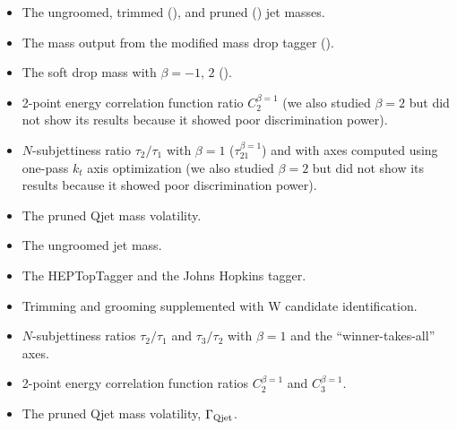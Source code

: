 \begin{itemize}
\item The ungroomed, trimmed (\mtrim), and pruned (\mprun) jet masses.
\item The mass output from the modified mass drop tagger (\mmdt).
\item The soft drop mass with $\beta=-1,\,2$ (\msd).
\item 2-point energy correlation function ratio $C_2^{\beta=1}$  (we also studied $\beta=2$ but did not show its results because it showed poor discrimination power).
\item $N$-subjettiness ratio $\tau_2 / \tau_1$ with $\beta=1$ ($\tau_{21}^{\beta=1}$) and with axes computed using one-pass $k_t$ axis optimization (we also studied $\beta=2$ but did not show its results because it showed poor discrimination power).
\item The pruned Qjet mass volatility.
\end{itemize}

\begin{itemize}
\item The ungroomed jet mass.
\item The HEPTopTagger and the Johns Hopkins tagger.
\item Trimming and grooming supplemented with W candidate identification.
\item $N$-subjettiness ratios $\tau_2 / \tau_1$ and $\tau_3/\tau_2$ with $\beta=1$ and the ``winner-takes-all'' axes.
\item 2-point energy correlation function ratios $C_2^{\beta=1}$ and $C_3^{\beta=1}$.
\item The pruned Qjet mass volatility, $\Gamma_{\rm Qjet}$.
\end{itemize}







